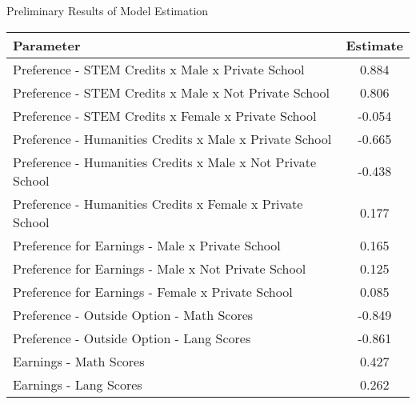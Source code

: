 \documentclass[table,10pt]{beamer}
\begin{document}
\begin{frame}{Preliminary Results of Model Estimation}

\begin{center}
\begin{tabular}{lc}
	\hline\hline
	\textbf{Parameter} & \textbf{Estimate} \\
	\hline
	Preference - STEM Credits x Male   x Private School & 0.884 \\
	Preference - STEM Credits x Male   x Not Private School & 0.806 \\
	Preference - STEM Credits x Female   x Private School & -0.054 \\
	\hline
	Preference - Humanities Credits x Male   x Private School & -0.665 \\
	Preference - Humanities Credits x Male   x Not Private School & -0.438 \\
	Preference - Humanities Credits x Female   x Private School & 0.177 \\
	\hline
	Preference for  Earnings - Male   x Private School & 0.165 \\
	Preference for  Earnings - Male   x Not Private School & 0.125 \\
	Preference for  Earnings - Female   x Private School & 0.085 \\
	\hline
	Preference - Outside Option - Math Scores & -0.849 \\
	Preference - Outside Option - Lang Scores & -0.861 \\
	\hline
	Earnings - Math Scores & 0.427 \\
	Earnings - Lang Scores & 0.262 \\
	\hline\hline
\end{tabular}
\end{center}
\end{frame}
\end{document}
